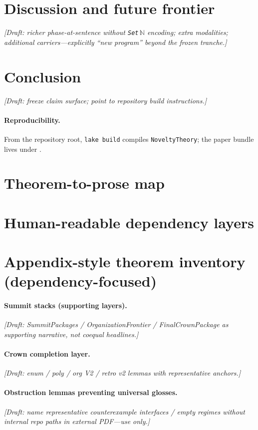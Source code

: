 \documentclass[11pt,a4paper]{article}
\theoremstyle{definition}
\begin{document}
\section{Discussion and future frontier}\label{sec:discussion}

\emph{[Draft: richer phase-at-sentence without \texttt{Set}\,$\mathbb{N}$ encoding; extra modalities; additional carriers---explicitly ``new program'' beyond the frozen tranche.]}

\section{Conclusion}\label{sec:conclusion}

\emph{[Draft: freeze claim surface; point to repository build instructions.]}

\paragraph{Reproducibility.}
From the repository root, \texttt{lake build} compiles \texttt{NoveltyTheory}; the paper bundle lives under .

\appendix

\section{Theorem-to-prose map}\label{sec:appendix-map}


\section{Human-readable dependency layers}\label{sec:appendix-dag}


\section{Appendix-style theorem inventory (dependency-focused)}\label{sec:appendix-inventory}

\paragraph{Summit stacks (supporting layers).}
\emph{[Draft: SummitPackages / OrganizationFrontier / FinalCrownPackage as supporting narrative, not coequal headlines.]}

\paragraph{Crown completion layer.}
\emph{[Draft: enum / poly / org V2 / retro v2 lemmas with representative \leanref{} anchors.]}

\paragraph{Obstruction lemmas preventing universal glosses.}
\emph{[Draft: name representative counterexample interfaces / empty regimes without internal repo paths in external PDF---use \leanref{} only.]}



\end{document}
